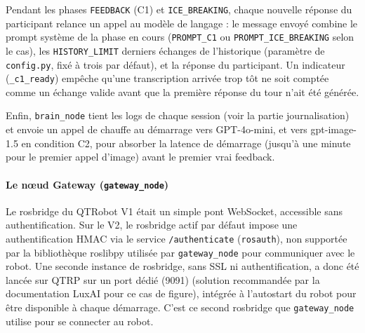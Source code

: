 \documentclass[11pt]{article}
\begin{document}
Pendant les phases \texttt{FEEDBACK} (C1) et \texttt{ICE\_BREAKING}, chaque nouvelle réponse du participant relance un appel au modèle de langage : le message envoyé combine le prompt système de la phase en cours (\texttt{PROMPT\_C1} ou \texttt{PROMPT\_ICE\_BREAKING} selon le cas), les \texttt{HISTORY\_LIMIT} derniers échanges de l'historique (paramètre de \texttt{config.py}, fixé à trois par défaut), et la réponse du participant. Un indicateur (\texttt{\_c1\_ready}) empêche qu'une transcription arrivée trop tôt ne soit comptée comme un échange valide avant que la première réponse du tour n'ait été générée.

Enfin, \texttt{brain\_node} tient les logs de chaque session (voir la partie journalisation) et envoie un appel de chauffe au démarrage vers GPT-4o-mini, et vers gpt-image-1.5 en condition C2, pour absorber la latence de démarrage (jusqu'à une minute pour le premier appel d'image) avant le premier vrai feedback.

\paragraph{Le nœud Gateway (\texttt{gateway\_node})}

Le rosbridge du QTRobot V1 était un simple pont WebSocket, accessible sans authentification. Sur le V2, le rosbridge actif par défaut impose une authentification HMAC via le service \texttt{/authenticate} (\texttt{rosauth}), non supportée par la bibliothèque roslibpy utilisée par \texttt{gateway\_node} pour communiquer avec le robot. Une seconde instance de rosbridge, sans SSL ni authentification, a donc été lancée sur QTRP sur un port dédié (9091) (solution recommandée par la documentation LuxAI pour ce cas de figure), intégrée à l'autostart du robot pour être disponible à chaque démarrage. C'est ce second rosbridge que \texttt{gateway\_node} utilise pour se connecter au robot.
\end{document}
